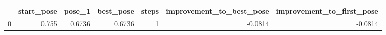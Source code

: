 \begin{tabular}{lrrrrrr}
\toprule
{} &  start\_pose &  pose\_1 &  best\_pose &  steps &  improvement\_to\_best\_pose &  improvement\_to\_first\_pose \\
\midrule
0 &       0.755 &  0.6736 &     0.6736 &      1 &                   -0.0814 &                    -0.0814 \\
\bottomrule
\end{tabular}
